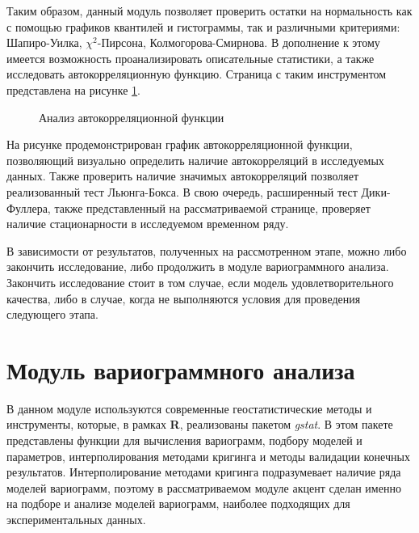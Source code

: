 Таким образом, данный модуль позволяет проверить остатки на нормальность как с помощью графиков квантилей и гистограммы, так и различными критериями: Шапиро-Уилка, $ \chi^2 $-Пирсона, Колмогорова-Смирнова. В дополнение к этому имеется возможность проанализировать описательные статистики, а также исследовать автокорреляционную функцию. Страница с таким инструментом представлена на рисунке \ref{img:mod_acf}.
\begin{figure}[ht]
\caption{Анализ автокорреляционной функции}
\label{img:mod_acf}
\end{figure}
На рисунке продемонстрирован график автокорреляционной функции, позволяющий визуально определить наличие автокорреляций в исследуемых данных. Также проверить наличие значимых автокорреляций позволяет реализованный тест Льюнга-Бокса. В свою очередь, расширенный тест Дики-Фуллера, также представленный на рассматриваемой странице, проверяет наличие стационарности в исследуемом временном ряду.

В зависимости от результатов, полученных на рассмотренном этапе, можно либо закончить исследование, либо продолжить в модуле вариограммного анализа. Закончить исследование стоит в том случае, если модель удовлетворительного качества, либо в случае, когда не выполняются условия для проведения следующего этапа.


\section{Модуль вариограммного анализа} %
\label{sec:mod_variogram}

В данном модуле используются современные геостатистические методы и инструменты, которые, в рамках \textbf{R}, реализованы пакетом \textit{gstat}. В этом пакете представлены функции для вычисления вариограмм, подбору моделей и параметров, интерполирования методами кригинга и методы валидации конечных результатов. Интерполирование методами кригинга подразумевает наличие ряда моделей вариограмм, поэтому в рассматриваемом модуле акцент сделан именно на подборе и анализе моделей вариограмм, наиболее подходящих для экспериментальных данных.

